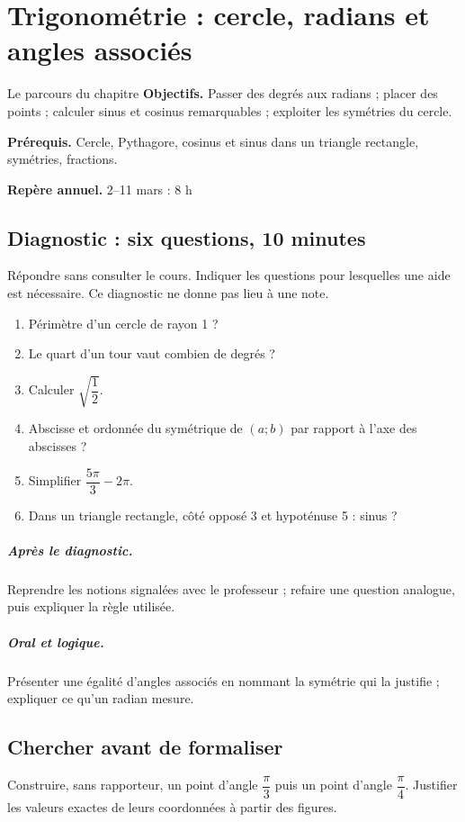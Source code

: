 \chapter{Trigonométrie : cercle, radians et angles associés}\label{C10}
\begin{repere}{Le parcours du chapitre}
\textbf{Objectifs.} Passer des degrés aux radians ; placer des points ; calculer sinus et cosinus remarquables ; exploiter les symétries du cercle.

\textbf{Prérequis.} Cercle, Pythagore, cosinus et sinus dans un triangle rectangle, symétries, fractions.

\textbf{Repère annuel.} 2–11 mars : 8 h\end{repere}
\section*{Diagnostic : six questions, 10 minutes}\label{C10-D}
Répondre sans consulter le cours. Indiquer les questions pour lesquelles une aide est nécessaire. Ce diagnostic ne donne pas lieu à une note.
\begin{enumerate}
\item Périmètre d’un cercle de rayon 1 ?
\item Le quart d’un tour vaut combien de degrés ?
\item Calculer $\sqrt {\dfrac{1}{2}}$.
\item Abscisse et ordonnée du symétrique de $(a;b)$ par rapport à l’axe des abscisses ?
\item Simplifier $\dfrac{5\pi}{3}-2\pi $.
\item Dans un triangle rectangle, côté opposé 3 et hypoténuse 5 : sinus ?
\end{enumerate}
\paragraph{Après le diagnostic.} Reprendre les notions signalées avec le professeur ; refaire une question analogue, puis expliquer la règle utilisée.
\paragraph{Oral et logique.} Présenter une égalité d’angles associés en nommant la symétrie qui la justifie ; expliquer ce qu’un radian mesure.
\clearpage
\section*{Chercher avant de formaliser}\label{C10-RECH}
Construire, sans rapporteur, un point d’angle $\dfrac{\pi}{3}$ puis un point d’angle $\dfrac{\pi}{4}$. Justifier les valeurs exactes de leurs coordonnées à partir des figures.

